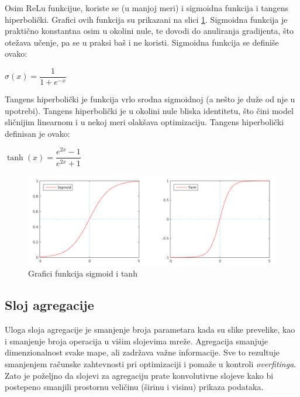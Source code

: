 \documentclass[a4paper]{article}
\begin{document}
Osim ReLu funkcijue, koriste se (u manjoj meri) i sigmoidna funkcija i tangens hiperbolički. Grafici ovih funkcija su prikazani na slici \ref{fig:sigmoid_tanh}. Sigmoidna funkcija je praktično konstantna osim u okolini nule, te dovodi do anuliranja gradijenta, što otežava učenje, pa se u praksi baš i ne koristi. Sigmoidna funkcija se definiše ovako:

\begin{center}
$\sigma(x) = \dfrac{1}{1 + e^{-x}}$
\end{center}

Tangens hiperbolički je funkcija vrlo srodna sigmoidnoj (a nešto je duže od nje u upotrebi). Tangens hiperbolički je u okolini nule bliska identitetu, što čini model sličnijim linearnom i u nekoj meri olakšava optimizaciju. Tangens hiperbolički definisan je ovako:

\begin{center}
$\tanh(x) = \dfrac{e^{2x}-1}{e^{2x}+1}$
\end{center}


\begin{figure}[h!]
\begin{center}
\includegraphics[scale=0.5]{sigmoid_tanh_graph.png}
\end{center}
\caption{Grafici funkcija sigmoid i tanh}
\label{fig:sigmoid_tanh}
\end{figure}



\newpage


\subsection{Sloj agregacije}
\label{sloj_agregacije}

Uloga sloja agregacije je smanjenje broja parametara kada su slike prevelike, kao i smanjenje broja operacija u višim slojevima mreže. Agregacija smanjuje dimenzionalnost svake mape, ali zadržava važne informacije. Sve to rezultuje smanjenjem računske zahtevnosti pri optimizaciji i pomaže u kontroli \textit{overfitinga}. Zato je poželjno da slojevi za agregaciju prate konvolutivne slojeve kako bi postepeno smanjili prostornu veličinu (širinu i visinu) prikaza podataka.
\end{document}
